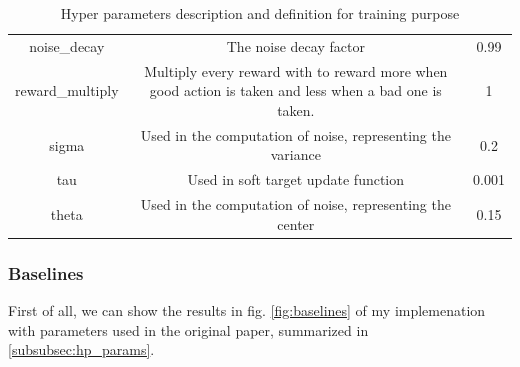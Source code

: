 \documentclass{article}
\begin{document}
\begin{table}[ht]
\begin{adjustbox}{width=1\textwidth}
\begin{tabular}{ |c|c|c| }
      noise\_decay & The noise decay factor & 0.99 \\
      reward\_multiply & Multiply every reward with to reward more when good action is taken and less when a bad one is taken. & 1 \\
      sigma & Used in the computation of noise, representing the variance & 0.2 \\
      tau & Used in soft target update function & 0.001 \\
      theta & Used in the computation of noise, representing the center & 0.15 \\
      \hline
    \end{tabular}
  \end{adjustbox}
  \caption{Hyper parameters description and definition for training purpose}
  \label{tab:hyperparams}
\end{table}

\subsubsection{Baselines}

First of all, we can show the results in fig. \ref{fig:baselines} of my
implemenation with parameters used in the original paper, summarized in
\ref{subsubsec:hp_params}.
\end{document}
